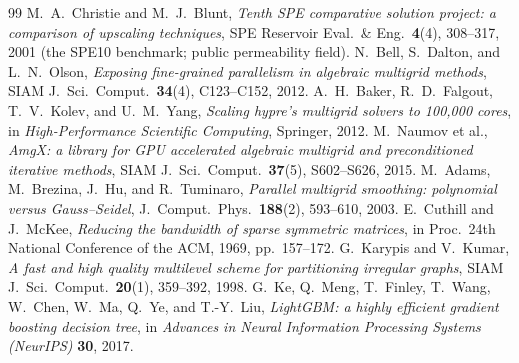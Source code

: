 \documentclass[leqno,letterpaper]{etna}
\begin{document}
\begin{thebibliography}{99}
 M.~A.~Christie and M.~J.~Blunt, \emph{Tenth SPE comparative solution
project: a comparison of upscaling techniques}, SPE Reservoir Eval.\ \& Eng.\ \textbf{4}(4),
308--317, 2001 (the SPE10 benchmark; public permeability field).
 N.~Bell, S.~Dalton, and L.~N.~Olson, \emph{Exposing fine-grained
parallelism in algebraic multigrid methods}, SIAM J.\ Sci.\ Comput.\ \textbf{34}(4), C123--C152, 2012.
 A.~H.~Baker, R.~D.~Falgout, T.~V.~Kolev, and U.~M.~Yang, \emph{Scaling
hypre's multigrid solvers to 100{,}000 cores}, in \emph{High-Performance Scientific Computing},
Springer, 2012.
 M.~Naumov et al., \emph{AmgX: a library for GPU accelerated algebraic multigrid and
preconditioned iterative methods}, SIAM J.\ Sci.\ Comput.\ \textbf{37}(5), S602--S626, 2015.
 M.~Adams, M.~Brezina, J.~Hu, and R.~Tuminaro, \emph{Parallel multigrid
smoothing: polynomial versus Gauss--Seidel}, J.\ Comput.\ Phys.\ \textbf{188}(2), 593--610, 2003.
 E.~Cuthill and J.~McKee, \emph{Reducing the bandwidth of sparse symmetric
matrices}, in Proc.\ 24th National Conference of the ACM, 1969, pp.~157--172.
 G.~Karypis and V.~Kumar, \emph{A fast and high quality multilevel scheme for
partitioning irregular graphs}, SIAM J.\ Sci.\ Comput.\ \textbf{20}(1), 359--392, 1998.
 G.~Ke, Q.~Meng, T.~Finley, T.~Wang, W.~Chen, W.~Ma, Q.~Ye, and T.-Y.~Liu,
\emph{LightGBM: a highly efficient gradient boosting decision tree}, in \emph{Advances in Neural
Information Processing Systems (NeurIPS)} \textbf{30}, 2017.
\end{thebibliography}
\end{document}
